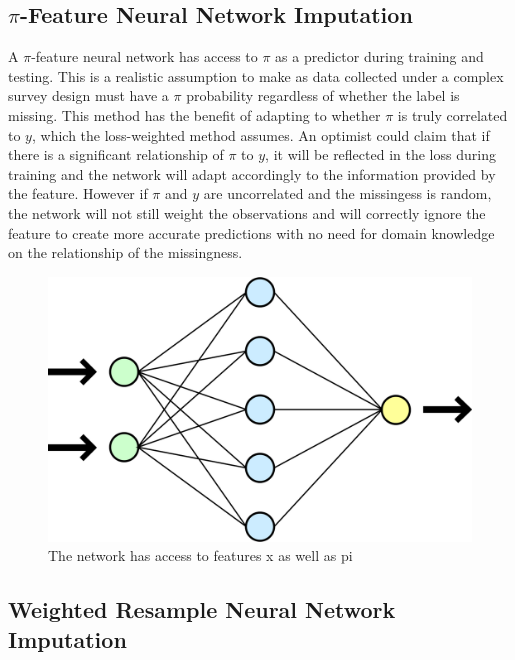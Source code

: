 \documentclass[12pt,twoside]{reedthesis}
\begin{document}
\subsection{\texorpdfstring{\(\pi\)-Feature Neural Network
Imputation}{\textbackslash{}pi-Feature Neural Network Imputation}}\label{pi-feature-neural-network-imputation}

A \(\pi\)-feature neural network has access to \(\pi\) as a predictor
during training and testing. This is a realistic assumption to make as
data collected under a complex survey design must have a \(\pi\)
probability regardless of whether the label is missing. This method has
the benefit of adapting to whether \(\pi\) is truly correlated to \(y\),
which the loss-weighted method assumes. An optimist could claim that if
there is a significant relationship of \(\pi\) to \(y\), it will be
reflected in the loss during training and the network will adapt
accordingly to the information provided by the feature. However if
\(\pi\) and \(y\) are uncorrelated and the missingess is random, the
network will not still weight the observations and will correctly ignore
the feature to create more accurate predictions with no need for domain
knowledge on the relationship of the missingness.
\begin{figure}
\includegraphics[width=0.8\linewidth]{figure/network} \caption{The network has access to features x as well as pi}\label{fig:feature}
\end{figure}
\subsection{Weighted Resample Neural Network
Imputation}\label{weighted-resample-neural-network-imputation}
\end{document}
